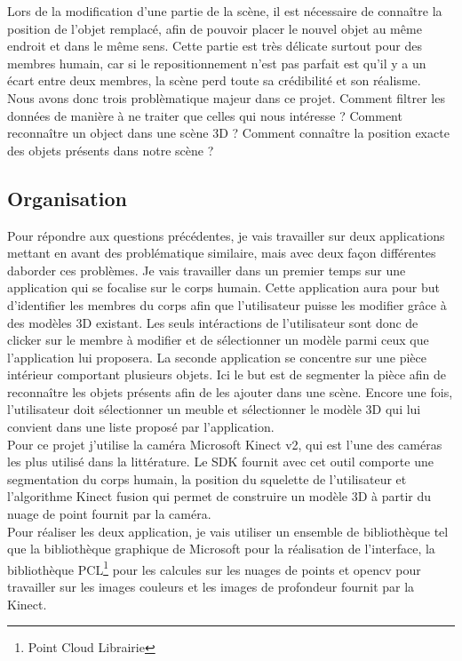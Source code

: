 Lors de la modification d'une partie de la scène, il est nécessaire de connaître la position de l'objet remplacé, afin de pouvoir
placer le nouvel objet au même endroit et dans le même sens. Cette partie est très délicate surtout pour des membres humain, car
si le repositionnement n'est pas parfait est qu'il y a un écart entre deux membres, la scène perd toute sa crédibilité et son 
réalisme.\\

Nous avons donc trois problèmatique majeur dans ce projet. Comment filtrer les données de manière à ne traiter que celles qui nous
intéresse ? Comment reconnaître un object dans une scène 3D ? Comment connaître la position exacte des objets présents dans notre
scène ?

\subsection{Organisation}

Pour répondre aux questions précédentes, je vais travailler sur deux applications mettant en avant des problématique similaire,
mais avec deux façon différentes daborder ces problèmes. Je vais travailler dans un premier temps sur une application qui se focalise
sur le corps humain. Cette application aura pour but d'identifier les membres du corps afin que l'utilisateur puisse les modifier
grâce à des modèles 3D existant. Les seuls intéractions de l'utilisateur sont donc de clicker sur le membre à modifier et de sélectionner
un modèle parmi ceux que l'application lui proposera. La seconde application se concentre sur une pièce intérieur comportant plusieurs
objets. Ici le but est de segmenter la pièce afin de reconnaître les objets présents afin de les ajouter dans une scène. Encore une fois,
l'utilisateur doit sélectionner un meuble et sélectionner le modèle 3D qui lui convient dans une liste proposé par l'application.\\

Pour ce projet j'utilise la caméra Microsoft Kinect v2, qui est l'une des caméras les plus utilisé dans la littérature. Le SDK fournit
avec cet outil comporte une segmentation du corps humain, la position du squelette de l'utilisateur et l'algorithme Kinect fusion qui
permet de construire un modèle 3D à partir du nuage de point fournit par la caméra.\\

Pour réaliser les deux application, je vais utiliser un ensemble de bibliothèque tel que la bibliothèque graphique de Microsoft pour
la réalisation de l'interface, la bibliothèque PCL\footnote{Point Cloud Librairie}\cite{PCL} pour les calcules sur les nuages de points et 
opencv pour travailler sur les images couleurs et les images de profondeur fournit par la Kinect.
